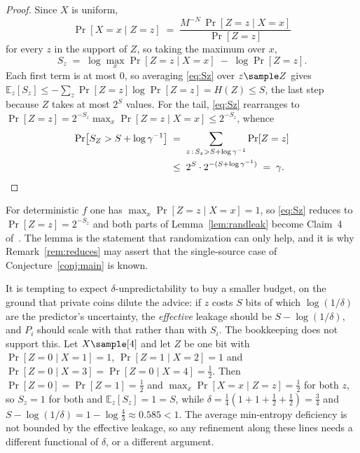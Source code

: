 \documentclass{conjura-conjecture}
\newcommand{\Prob}[1]{\Pr\!\left[#1\right]}
\newcommand{\Exp}{\mathbb{E}}
\begin{document}
\begin{proof}
Since $X$ is uniform,
\[
  \Prob{X = x \mid Z = z} \;=\;
  \frac{M^{-N}\,\Prob{Z = z \mid X = x}}{\Prob{Z = z}}
\]
for every $z$ in the support of $Z$, so taking the maximum over $x$,
\begin{equation}\label{eq:Sz}
  S_z \;=\; \log \max_{x} \Prob{Z = z \mid X = x} \;-\; \log \Prob{Z = z}.
\end{equation}
Each first term is at most $0$, so averaging \eqref{eq:Sz} over
$z \sample Z$ gives $\Exp_z[S_z] \le -\sum_z \Prob{Z = z}\log\Prob{Z = z}
= H(Z) \le S$, the last step because $Z$ takes at most $2^{S}$ values. For
the tail, \eqref{eq:Sz} rearranges to $\Prob{Z = z} = 2^{-S_z}\max_x
\Prob{Z = z \mid X = x} \le 2^{-S_z}$, whence
\begin{align*}
  \Prob{S_Z > S + \log\gamma^{-1}}
  &\;=\; \sum_{z\,:\,S_z > S + \log\gamma^{-1}} \Prob{Z = z} \\
  &\;\le\; 2^{S}\cdot 2^{-(S + \log\gamma^{-1})} \;=\; \gamma . \qedhere
\end{align*}
\end{proof}

\begin{remark}\label{rem:claim4}
For deterministic $f$ one has $\max_x \Prob{Z = z \mid X = x} = 1$, so
\eqref{eq:Sz} reduces to $\Prob{Z = z} = 2^{-S_z}$ and both parts of
Lemma~\ref{lem:randleak} become Claim~4 of~\cite{CDGS}. The lemma is the
statement that randomization can only help, and it is why
Remark~\ref{rem:reduces} may assert that the single-source case of
Conjecture~\ref{conj:main} is known.
\end{remark}

\begin{remark}\label{rem:effective}
It is tempting to expect $\delta$-unpredictability to buy a smaller
budget, on the ground that private coins dilute the advice: if $z$ costs
$S$ bits of which $\log(1/\delta)$ are the predictor's uncertainty, the
\emph{effective} leakage should be $S - \log(1/\delta)$, and $P_i$ should
scale with that rather than with $S_i$. The bookkeeping does not support
this. Let $X \sample [4]$ and let $Z$ be one bit with
$\Prob{Z = 0 \mid X = 1} = 1$, $\Prob{Z = 1 \mid X = 2} = 1$ and
$\Prob{Z = 0 \mid X = 3} = \Prob{Z = 0 \mid X = 4} = \tfrac12$. Then
$\Prob{Z = 0} = \Prob{Z = 1} = \tfrac12$ and
$\max_x \Prob{X = x \mid Z = z} = \tfrac12$ for both $z$, so $S_z = 1$ for
both and $\Exp_z[S_z] = 1 = S$, while
$\delta = \tfrac14(1+1+\tfrac12+\tfrac12) = \tfrac34$ and
$S - \log(1/\delta) = 1 - \log\tfrac43 \approx 0.585 < 1$. The average
min-entropy deficiency is not bounded by the effective leakage, so any
refinement along these lines needs a different functional of $\delta$, or
a different argument.
\end{remark}
\end{document}
